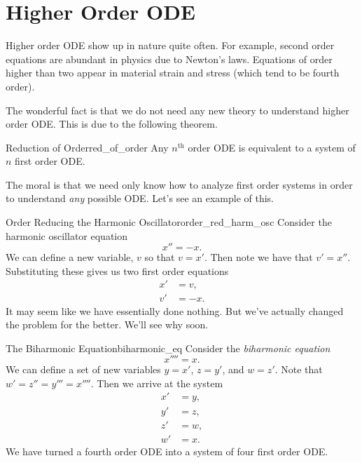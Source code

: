         
        \section{Higher Order ODE}
        Higher order ODE show up in nature quite often.  For example, second order equations are abundant in physics due to Newton's laws.  Equations of order higher than two appear in material strain and stress (which tend to be fourth order).  
        
        The wonderful fact is that we do not need any new theory to understand higher order ODE.  This is due to the following theorem.
        
        \begin{thm}{Reduction of Order}{red_of_order}
        Any $n ^\textrm{th}$ order ODE is equivalent to a system of $n$ first order ODE.  
        \end{thm}
        
        The moral is that we need only know how to analyze first order systems in order to understand \emph{any} possible ODE.  Let's see an example of this.
        
        \begin{ex}{Order Reducing the Harmonic Oscillator}{order_red_harm_osc}
        Consider the harmonic oscillator equation
        \[
        x''=-x.
        \]
        We can define a new variable, $v$ so that $v=x'$.  Then note we have that $v'=x''$.  Substituting these gives us two first order equations
        \begin{align*}
            x'&=v,\\
            v'&=-x.
        \end{align*}
        It may seem like we have essentially done nothing.  But we've actually changed the problem for the better.  We'll see why soon.
        \end{ex}
        
        \begin{ex}{The Biharmonic Equation}{biharmonic_eq}
        Consider the \emph{biharmonic equation}
        \[
        x''''=x.
        \]
        We can define a set of new variables $y=x'$, $z=y'$, and $w=z'$.  Note that $w'=z''=y'''=x''''$. Then we arrive at the system
        \begin{align*}
            x'&=y,\\
            y'&=z,\\
            z'&=w,\\
            w'&=x.
        \end{align*}
        We have turned a fourth order ODE into a system of four first order ODE.
        \end{ex}
        
